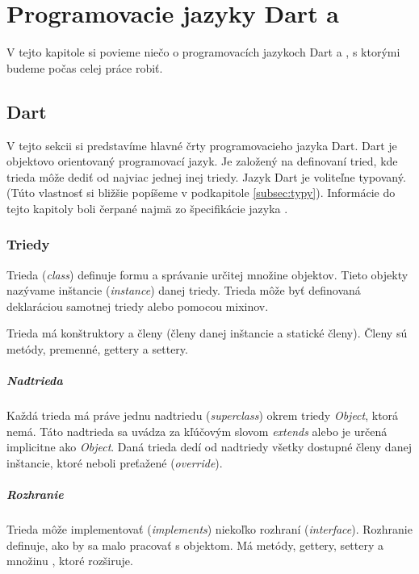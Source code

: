 \chapter{Programovacie jazyky Dart a \JS{}}

\label{kap:jazyky} %

V tejto kapitole si povieme niečo o programovacích jazykoch Dart a \JS{}, s ktorými budeme počas celej práce robiť.

\section{Dart}
\label{sec:dart}
V tejto sekcii si predstavíme hlavné črty programovacieho jazyka Dart. Dart je objektovo orientovaný programovací jazyk. Je založený na definovaní tried, kde trieda môže dediť od najviac jednej inej triedy. 
Jazyk Dart je voliteľne typovaný. (Túto vlastnosť si bližšie popíšeme v podkapitole \ref{subsec:typy}). 
Informácie do tejto kapitoly boli čerpané najmä zo špecifikácie jazyka \cite{DartLanguage}.

\subsection{Triedy}
Trieda (\emph{class}) definuje formu a správanie určitej množine objektov. Tieto objekty nazývame inštancie (\emph{instance}) danej triedy. 
Trieda môže byť definovaná deklaráciou samotnej triedy alebo pomocou mixinov.

Trieda má konštruktory a členy (členy danej inštancie a statické členy). Členy sú metódy, premenné, gettery a settery. 

\paragraph{Nadtrieda}
Každá trieda má práve jednu nadtriedu (\emph{superclass}) okrem triedy \emph{Object}, ktorá nemá. Táto nadtrieda sa uvádza za kľúčovým slovom \emph{extends} alebo je určená implicitne ako \emph{Object}. %
Daná trieda dedí od nadtriedy všetky dostupné členy danej inštancie, ktoré neboli preťažené (\emph{override}).

\paragraph{Rozhranie}
Trieda môže implementovať (\emph{implements}) niekoľko rozhraní (\emph{interface}). Rozhranie definuje, ako by sa malo pracovať s objektom. 
Má metódy, gettery, settery a množinu , ktoré rozširuje.

